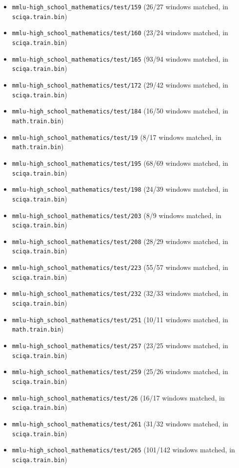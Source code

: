 \begin{itemize}
\item \texttt{mmlu-high\_school\_mathematics/test/159} (26/27 windows matched, in \texttt{sciqa.train.bin})
\item \texttt{mmlu-high\_school\_mathematics/test/160} (23/24 windows matched, in \texttt{sciqa.train.bin})
\item \texttt{mmlu-high\_school\_mathematics/test/165} (93/94 windows matched, in \texttt{sciqa.train.bin})
\item \texttt{mmlu-high\_school\_mathematics/test/172} (29/42 windows matched, in \texttt{sciqa.train.bin})
\item \texttt{mmlu-high\_school\_mathematics/test/184} (16/50 windows matched, in \texttt{math.train.bin})
\item \texttt{mmlu-high\_school\_mathematics/test/19} (8/17 windows matched, in \texttt{math.train.bin})
\item \texttt{mmlu-high\_school\_mathematics/test/195} (68/69 windows matched, in \texttt{sciqa.train.bin})
\item \texttt{mmlu-high\_school\_mathematics/test/198} (24/39 windows matched, in \texttt{sciqa.train.bin})
\item \texttt{mmlu-high\_school\_mathematics/test/203} (8/9 windows matched, in \texttt{sciqa.train.bin})
\item \texttt{mmlu-high\_school\_mathematics/test/208} (28/29 windows matched, in \texttt{sciqa.train.bin})
\item \texttt{mmlu-high\_school\_mathematics/test/223} (55/57 windows matched, in \texttt{sciqa.train.bin})
\item \texttt{mmlu-high\_school\_mathematics/test/232} (32/33 windows matched, in \texttt{sciqa.train.bin})
\item \texttt{mmlu-high\_school\_mathematics/test/251} (10/11 windows matched, in \texttt{math.train.bin})
\item \texttt{mmlu-high\_school\_mathematics/test/257} (23/25 windows matched, in \texttt{sciqa.train.bin})
\item \texttt{mmlu-high\_school\_mathematics/test/259} (25/26 windows matched, in \texttt{sciqa.train.bin})
\item \texttt{mmlu-high\_school\_mathematics/test/26} (16/17 windows matched, in \texttt{sciqa.train.bin})
\item \texttt{mmlu-high\_school\_mathematics/test/261} (31/32 windows matched, in \texttt{sciqa.train.bin})
\item \texttt{mmlu-high\_school\_mathematics/test/265} (101/142 windows matched, in \texttt{sciqa.train.bin})

\end{itemize}
